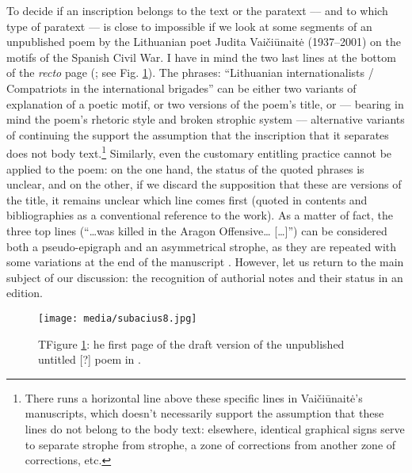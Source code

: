 \documentclass{article}
\begin{document}
To decide if an inscription belongs to the text or the paratext –– and
to which type of paratext –– is close to impossible if we look at some
segments of an unpublished poem by the Lithuanian poet Judita
Vaičiūnaitė (1937--2001) on the motifs of the Spanish Civil War. I have
in mind the two last lines at the bottom of the \emph{recto} page
(\citealt[1r]{vaiciunaite_untitled_1961}; see Fig. \ref{fig:subacius8}). The phrases: ``Lithuanian
internationalists / Compatriots in the international brigades'' can
be either two variants of explanation of a poetic motif, or two versions
of the poem's title, or –– bearing in mind the poem's rhetoric style
and broken strophic system –– alternative variants of continuing the
  support the assumption that the inscription that it separates does not
body text.\footnote{There runs a horizontal line above these specific lines in Vaičiūnaitė's manuscripts, which doesn't necessarily support the assumption that these lines do not belong to the body text: elsewhere, identical graphical signs serve
  to separate strophe from strophe, a zone of corrections from another
  zone of corrections, etc.} Similarly, even the customary
entitling practice cannot be applied to the poem: on the one hand, the
status of the quoted phrases is unclear, and on the other, if we discard
the supposition that these are versions of the title, it remains unclear
which line comes first (quoted in contents and bibliographies as a
conventional reference to the work). As a matter of fact, the three top
lines (``\ldots was killed in the Aragon Offensive\ldots{} [\ldots]'')
can be considered both a pseudo-epigraph and an asymmetrical strophe, as
they are repeated with some variations at the end of the manuscript \citep[1v]{vaiciunaite_untitled_1961}. However, let us return to the main subject of our
discussion: the recognition of authorial notes and their status in an
edition.

\begin{figure}[H]
    \centering
    \texttt{[image: media/subacius8.jpg]}
    \caption{TFigure \ref{fig:subacius8}: he first page of the draft version of the unpublished untitled {[}?{]} poem in \citealt[1r]{vaiciunaite_untitled_1961}.}
    \label{fig:subacius8}
\end{figure}
\end{document}
